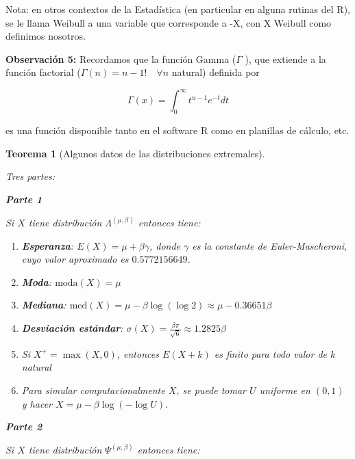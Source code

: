 \documentclass[
  20pt,
]{book}
\newtheorem{theorem}{Teorema}[chapter]
\theoremstyle{definition}
\theoremstyle{definition}
\theoremstyle{definition}
\theoremstyle{definition}
\theoremstyle{remark}
\begin{document}
Nota: en otros contextos de la Estadística (en particular en
alguna rutinas del R), se le llama Weibull a una variable que
corresponde a -X, con X Weibull como definimos nosotros.

\textbf{Observación 5:} Recordamos que la función
Gamma (\(\Gamma\) ), que extiende a la función factorial
(\(\Gamma(n)=n-1!\quad \forall n\) natural) definida por

\begin{equation}
\Gamma(x)=\int_{0}^{\infty} t^{u-1}e^{-t}dt
\end{equation}

es una función disponible tanto en el software R
como en planillas de cálculo, etc.

\begin{theorem}[Algunos datos de las distribuciones extremales]
\protect\hypertarget{thm:foo2}{}\label{thm:foo2}

Tres partes:

\textbf{Parte 1}

Si \(X\) tiene distribución \(\Lambda^{(\mu,\beta)}\) entonces tiene:

\begin{enumerate}
\def\labelenumi{\alph{enumi})}
\item
  \textbf{Esperanza}: \(E(X) = \mu + \beta\gamma\), donde \(\gamma\) es la constante de Euler-Mascheroni, cuyo valor aproximado es \(0.5772156649\).
\item
  \textbf{Moda}: \(\text{moda}(X)=\mu\)
\item
  \textbf{Mediana}: \(\text{med}(X)=\mu - \beta \log(\log 2) \approx \mu - 0.36651 \beta\)
\item
  \textbf{Desviación estándar}: \(\sigma(X)=\frac{\beta \pi}{\sqrt{6}}   \approx 1.2825 \beta\)
\item
  Si \(X^+ = \max(X,0)\), entonces \(E(X+k)\) es finito para todo valor de \(k\) natural
\item
  Para simular computacionalmente \(X\), se puede tomar \(U\) uniforme en \((0,1)\) y hacer \(X = \mu - \beta \log(-\log U)\).
\end{enumerate}

\textbf{Parte 2}

Si \(X\) tiene distribución \(\Psi^{(\mu, \beta)}\) entonces tiene:


\end{theorem}
\end{document}
